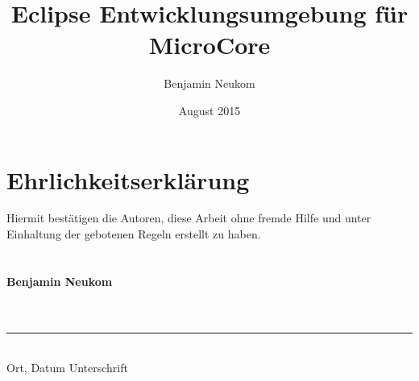 \documentclass[listof=totocnumbered,bibliography=totocnumbered]{scrreprt}
\numberwithin{equation}{subsection}
\begin{document}
\subject{Bachelor-Thesis}
\title{Eclipse Entwicklungsumgebung für MicroCore}
\author{Benjamin Neukom}
\date{August 2015\\}
\publishers{Betreuer: Carlo Nicola}

\maketitle

\tableofcontents










\appendix

{}

\newpage

\listoffigures
\listoftables

\newpage
\chapter{Ehrlichkeitserklärung}
Hiermit bestätigen die Autoren, diese Arbeit ohne fremde Hilfe und unter Einhaltung der gebotenen Regeln erstellt zu haben.
\\
\\
\\
\textbf{Benjamin Neukom}
\\
\\
\\
\rule{0.75\textwidth}{0.4pt} \\
Ort, Datum \hspace * {4cm} Unterschrift
\end{document}
